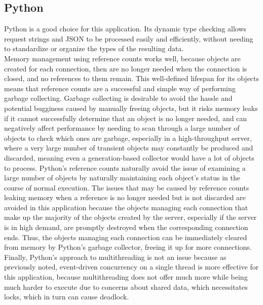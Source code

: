 \documentclass[letterpaper,twocolumn,10pt]{article}
\begin{document}
    \subsection{Python}
    Python is a good choice for this application. Its dynamic type checking allows request strings and JSON to be processed easily and efficiently, without needing to standardize or organize the types of the resulting data. \\
    Memory management using reference counts works well, because objects are created for each connection, then are no longer needed when the connection is closed, and no references to them remain. This well-defined lifespan for its objects means that reference counts are a successful and simple way of performing garbage collecting. Garbage collecting is desirable to avoid the hassle and potential bugginess caused by manually freeing objects, but it risks memory leaks if it cannot successfully determine that an object is no longer needed, and can negatively affect performance by needing to scan through a large number of objects to check which ones are garbage, especially in a high-throughput server, where a very large number of transient objects may constantly be produced and discarded, meaning even a generation-based collector would have a lot of objects to process. Python's reference counts naturally avoid the issue of examining a large number of objects by naturally maintaining each object's status in the course of normal execution. The issues that may be caused by reference counts leaking memory when a reference is no longer needed but is not discarded are avoided in this application because the objects managing each connection that make up the majority of the objects created by the server, especially if the server is in high demand, are promptly destroyed when the corresponding connection ends. Thus, the objects managing each connection can be immediately cleared from memory by Python's garbage collector, freeing it up for more connections. \\
    Finally, Python's approach to multithreading is not an issue because as previously noted, event-driven concurrency on a single thread is more effective for this application, because multithreading does not offer much more while being much harder to execute \cite{claburn} due to concerns about shared data, which necessitates locks, which in turn can cause deadlock.
\end{document}
